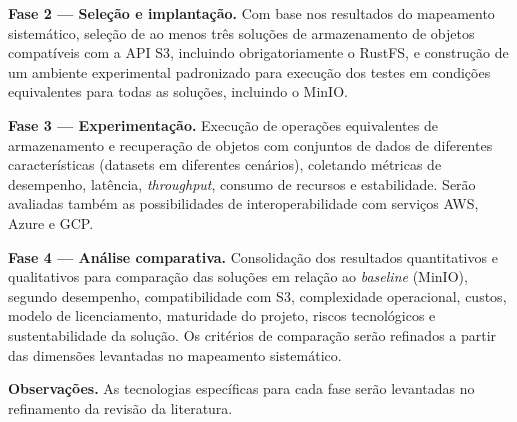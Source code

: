 \documentclass[bacharelado]{pre-projeto-computacao}
\begin{document}
\textbf{Fase 2 --- Seleção e implantação.}
Com base nos resultados do mapeamento sistemático, seleção de ao menos três
soluções de armazenamento de objetos compatíveis com a API S3, incluindo
obrigatoriamente o RustFS, e construção de um ambiente experimental padronizado
para execução dos testes em condições equivalentes para todas as soluções,
incluindo o MinIO.

\textbf{Fase 3 --- Experimentação.}
Execução de operações equivalentes de armazenamento e recuperação de objetos com
conjuntos de dados de diferentes características (datasets em diferentes cenários),
coletando métricas de desempenho, latência, \textit{throughput}, consumo de
recursos e estabilidade. Serão avaliadas também as possibilidades de
interoperabilidade com serviços AWS, Azure e GCP.

\textbf{Fase 4 --- Análise comparativa.}
Consolidação dos resultados quantitativos e qualitativos para comparação das
soluções em relação ao \textit{baseline} (MinIO), segundo desempenho,
compatibilidade com S3, complexidade operacional, custos, modelo de licenciamento,
maturidade do projeto, riscos tecnológicos e sustentabilidade da solução. Os
critérios de comparação serão refinados a partir das dimensões levantadas no
mapeamento sistemático.

\textbf{Observações.} As tecnologias específicas para cada fase serão levantadas
no refinamento da revisão da literatura.


\end{document}
